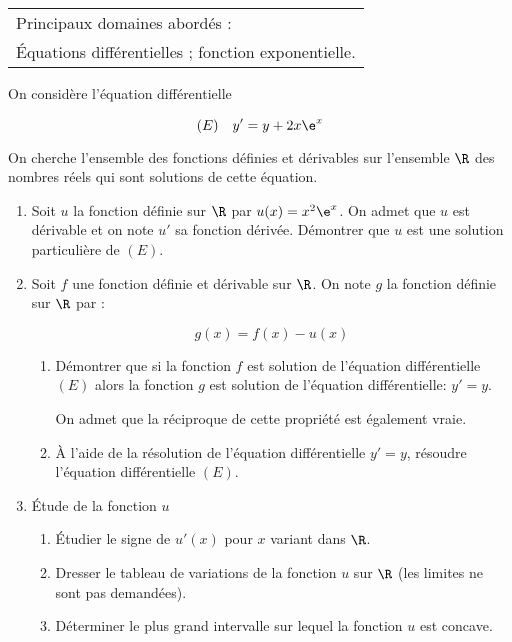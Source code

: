 
\vspace{0.5cm}

\begin{tabular}[]{|l|}
\hline
Principaux domaines abordés :\\
Équations différentielles ; fonction exponentielle.\\
\hline
\end{tabular}

\bigskip

On considère l’équation différentielle 

\[(E)\quad  y'= y + 2x\e^x\]
 
On cherche l'ensemble des fonctions définies et dérivables sur l'ensemble $\R$ des nombres réels qui sont solutions de cette équation. 

\begin{enumerate}
\item  Soit $u$ la fonction définie sur $\R$ par $u(x) = x^2\e^x$. On admet que $u$ est dérivable et on note $u'$ sa fonction dérivée. Démontrer que $u$ est une solution particulière de $(E)$. 

\item Soit $f$ une fonction définie et dérivable sur $\R$. On note $g$ la fonction définie sur $\R$ par : 

\[g(x) = f(x) - u(x)\]

	\begin{enumerate}
		\item  Démontrer que si la fonction $f$ est solution de l'équation différentielle $(E)$ alors la fonction $g$ est solution de l'équation différentielle: $y' =y$. 

On admet que la réciproque de cette propriété est également vraie. 
		\item À l'aide de la résolution de l'équation différentielle $y' =y$, résoudre l'équation différentielle $(E)$. 
	\end{enumerate}
\item Étude de la fonction $u $
	\begin{enumerate}
		\item  Étudier le signe de $u' (x)$ pour $x$ variant dans $\R$. 
		\item Dresser le tableau de variations de la fonction $u$ sur $\R$ (les limites ne sont pas demandées). 
		\item Déterminer le plus grand intervalle sur lequel la fonction $u$ est concave. 
\end{enumerate}
\end{enumerate}


